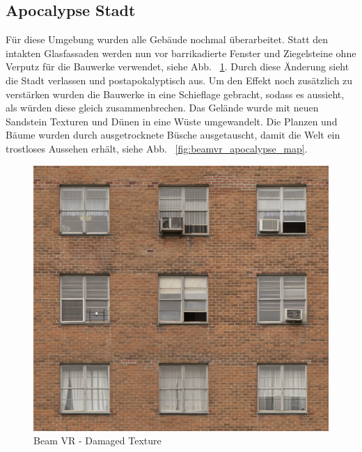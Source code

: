 \subsection{Apocalypse Stadt}\label{subsec:apocalypse-city}
F\"ur diese Umgebung wurden alle Geb\"aude nochmal \"uberarbeitet.
Statt den intakten Glasfassaden werden nun vor barrikadierte Fenster und Ziegelsteine ohne Verputz f\"ur die Bauwerke verwendet, siehe Abb. ~\ref{fig:beamvr_damaged_texture}.
Durch diese \"Anderung sieht die Stadt verlassen und postapokalyptisch aus.
Um den Effekt noch zus\"atzlich zu verst\"arken wurden die Bauwerke in eine Schieflage gebracht, sodass es aussieht, als w\"urden diese gleich zusammenbrechen.
Das Gel\"ande wurde mit neuen Sandstein Texturen und D\"unen in eine W\"uste umgewandelt.
Die Planzen und B\"aume wurden durch ausgetrocknete B\"usche ausgetauscht, damit die Welt ein trostloses Aussehen erhält, siehe Abb. ~\ref{fig:beamvr_apocalypse_map}.

\begin {figure}
    \centering
    \includegraphics{pics/beamvr_damaged_texture}
    \caption{Beam VR - Damaged Texture}
    \label{fig:beamvr_damaged_texture}
\end {figure}


